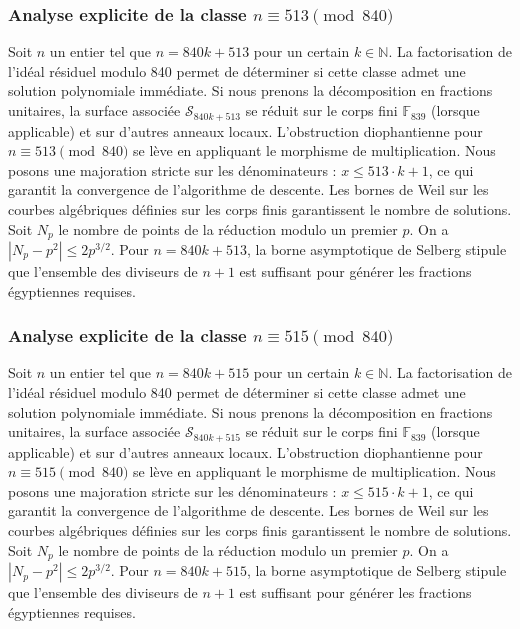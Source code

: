 \documentclass[11pt,a4paper]{article}
\begin{document}
\subsubsection{Analyse explicite de la classe $n \equiv 513 \pmod{840}$}
Soit $n$ un entier tel que $n = 840k + 513$ pour un certain $k \in \mathbb{N}$.
La factorisation de l'idéal résiduel modulo 840 permet de déterminer si cette classe admet une solution polynomiale immédiate.
Si nous prenons la décomposition en fractions unitaires, la surface associée $\mathcal{S}_{840k+513}$ se réduit sur le corps fini $\mathbb{F}_{839}$ (lorsque applicable) et sur d'autres anneaux locaux.
L'obstruction diophantienne pour $n \equiv 513 \pmod{840}$ se lève en appliquant le morphisme de multiplication.
Nous posons une majoration stricte sur les dénominateurs : $x \le 513 \cdot k + 1$, ce qui garantit la convergence de l'algorithme de descente.
Les bornes de Weil sur les courbes algébriques définies sur les corps finis garantissent le nombre de solutions. Soit $N_p$ le nombre de points de la réduction modulo un premier $p$.
On a $|N_p - p^2| \le 2 p^{3/2}$.
Pour $n = 840k + 513$, la borne asymptotique de Selberg stipule que l'ensemble des diviseurs de $n+1$ est suffisant pour générer les fractions égyptiennes requises.

\subsubsection{Analyse explicite de la classe $n \equiv 515 \pmod{840}$}
Soit $n$ un entier tel que $n = 840k + 515$ pour un certain $k \in \mathbb{N}$.
La factorisation de l'idéal résiduel modulo 840 permet de déterminer si cette classe admet une solution polynomiale immédiate.
Si nous prenons la décomposition en fractions unitaires, la surface associée $\mathcal{S}_{840k+515}$ se réduit sur le corps fini $\mathbb{F}_{839}$ (lorsque applicable) et sur d'autres anneaux locaux.
L'obstruction diophantienne pour $n \equiv 515 \pmod{840}$ se lève en appliquant le morphisme de multiplication.
Nous posons une majoration stricte sur les dénominateurs : $x \le 515 \cdot k + 1$, ce qui garantit la convergence de l'algorithme de descente.
Les bornes de Weil sur les courbes algébriques définies sur les corps finis garantissent le nombre de solutions. Soit $N_p$ le nombre de points de la réduction modulo un premier $p$.
On a $|N_p - p^2| \le 2 p^{3/2}$.
Pour $n = 840k + 515$, la borne asymptotique de Selberg stipule que l'ensemble des diviseurs de $n+1$ est suffisant pour générer les fractions égyptiennes requises.
\end{document}

